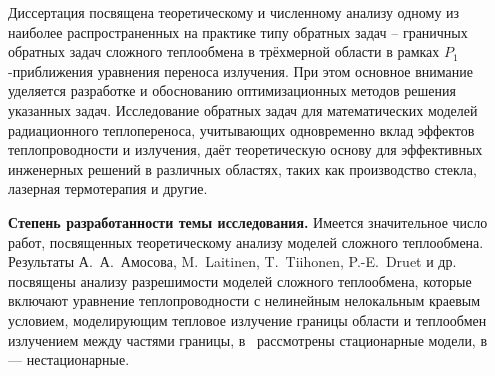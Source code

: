     Диссертация посвящена теоретическому и численному анализу одному из
    наиболее распространенных на практике типу обратных задач – граничных
    обратных задач сложного теплообмена в трёхмерной области в рамках
    $P_1$-приближения уравнения переноса излучения.
    При этом основное внимание уделяется разработке
    и обоснованию оптимизационных методов решения указанных задач.
    Исследование обратных задач для математических моделей
    радиационного теплопереноса, учитывающих одновременно вклад эффектов
    теплопроводности и излучения, даёт теоретическую основу для эффективных
    инженерных решений в различных областях, таких как производство стекла,
    лазерная термотерапия и другие.


    \textbf{Степень разработанности темы исследования.}
    Имеется значительное число работ, посвященных теоретическому анализу моделей сложного
    теплообмена.
    Результаты А.\ А.\ Амосова, M.\ Laitinen, T.\ Tiihonen, P.-E.\ Druet и др.~\cite{
        Amosov2005,
        Amosov2009,
        Amosov2010nonstationary,
        amosov2010stationary,
        druet2009weak,
        druet2010weak,
        laitinen2001conductive,
        metzger1999existence,
        Philip2010,
        Tiihonen1997a,
        Tiihonen1997b,
        amosov17,
        amosov18,
        Amosov20,
        Amosov21-1,
        Amosov2021-2,
        Amosov23} %
    посвящены анализу разрешимости моделей сложного теплообмена,
    которые включают уравнение теплопроводности с нелинейным нелокальным
    краевым условием, моделирующим тепловое излучение границы области и
    теплообмен излучением между частями границы,
    в~\cite{Amosov2009, amosov2010stationary, druet2009weak, laitinen2001conductive,
        Philip2010, Tiihonen1997a, Tiihonen1997b} %
    рассмотрены стационарные модели,
    в~\cite{
        Amosov2005, Amosov2010nonstationary,
        druet2010weak, laitinen2001conductive,
        metzger1999existence,
        Philip2010,
        Tiihonen1997a} — нестационарные.%

